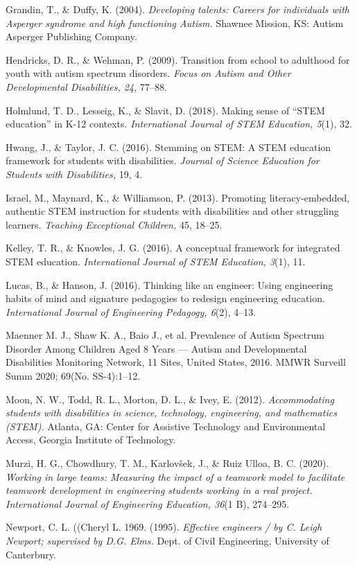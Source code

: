 \documentclass[11.5pt]{sig-alternate}
\begin{document}
Grandin, T., \& Duffy, K. (2004). \textit{Developing talents: Careers for individuals with Asperger syndrome and high functioning Autism.} Shawnee Mission, KS: Autism Asperger Publishing Company.

Hendricks, D. R., \& Wehman, P. (2009). Transition from school to adulthood for youth with autism spectrum disorders. \textit{Focus on Autism and Other Developmental Disabilities, 24,} 77–88. 

Holmlund, T. D., Lesseig, K., \& Slavit, D. (2018). Making sense of “STEM education” in K-12 contexts. \textit{International Journal of STEM Education, 5}(1), 32.

Hwang, J., \& Taylor, J. C. (2016). Stemming on STEM: A STEM education framework for students with disabilities. \textit{Journal of Science Education for Students with Disabilities,} 19, 4. 

Israel, M., Maynard, K., \& Williamson, P. (2013). Promoting literacy-embedded, authentic STEM instruction for students with disabilities and other struggling learners. \textit{Teaching Exceptional Children,} 45, 18–25. 

Kelley, T. R., \& Knowles, J. G. (2016). A conceptual framework for integrated STEM education. \textit{International Journal of STEM Education, 3}(1), 11.

Lucas, B., \& Hanson, J. (2016). Thinking like an engineer: Using engineering habits of mind and signature pedagogies to redesign engineering education. \textit{International Journal of Engineering Pedagogy, 6}(2), 4–13. 

Maenner M. J., Shaw K. A., Baio J., et al. Prevalence of Autism Spectrum Disorder Among Children Aged 8 Years — Autism and Developmental Disabilities Monitoring Network, 11 Sites, United States, 2016. MMWR Surveill Summ 2020; 69(No. SS-4):1–12.

Moon, N. W., Todd, R. L., Morton, D. L., \& Ivey, E. (2012). \textit{Accommodating students with disabilities in science, technology, engineering, and mathematics (STEM).} Atlanta, GA: Center for Assistive Technology and Environmental Access, Georgia Institute of Technology. 

Murzi, H. G., Chowdhury, T. M., Karlovšek, J., \& Ruiz Ulloa, B. C. (2020). \textit{Working in large teams: Measuring the impact of a teamwork model to facilitate teamwork development in engineering students working in a real project. International Journal of Engineering Education, 36}(1 B), 274–295.

Newport, C. L. ((Cheryl L. 1969. (1995). \textit{Effective engineers / by C. Leigh Newport; supervised by D.G. Elms.} Dept. of Civil Engineering, University of Canterbury.
\end{document}
